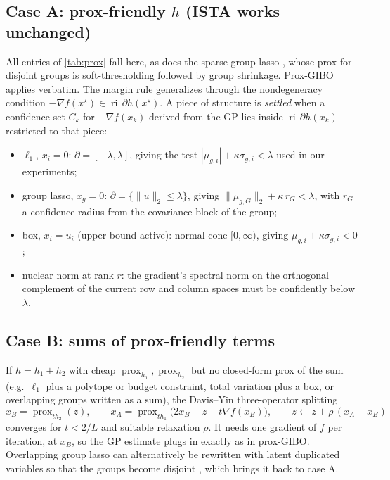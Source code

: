 \documentclass[10pt]{article}
\newcommand{\prox}{\operatorname{prox}}
\newcommand{\ri}{\operatorname{ri}}
\theoremstyle{remark}
\begin{document}
\subsection{Case A: prox-friendly $h$ (ISTA works unchanged)}
All entries of \cref{tab:prox} fall here, as does the sparse-group lasso \citep{simon2013sgl}, whose prox for disjoint groups is
soft-thresholding followed by group shrinkage. Prox-GIBO applies verbatim. The margin rule generalizes through the nondegeneracy condition
$-\nabla f(x^\star)\in\ri\,\partial h(x^\star)$. A piece of structure is \emph{settled} when a confidence set $C_k$ for $-\nabla f(x_k)$ derived from
the GP lies inside $\ri\,\partial h(x_k)$ restricted to that piece:
\begin{itemize}
\item $\ell_1$, $x_i=0$: $\partial=[-\lambda,\lambda]$, giving the test $|\mu_{g,i}|+\kappa\sigma_{g,i}<\lambda$ used in our experiments;
\item group lasso, $x_g=0$: $\partial=\{\|u\|_2\le\lambda\}$, giving $\|\mu_{g,G}\|_2+\kappa\,r_G<\lambda$, with $r_G$ a confidence radius from the
covariance block of the group;
\item box, $x_i=u_i$ (upper bound active): normal cone $[0,\infty)$, giving $\mu_{g,i}+\kappa\sigma_{g,i}<0$;
\item nuclear norm at rank $r$: the gradient's spectral norm on the orthogonal complement of the current row and column spaces must be
confidently below $\lambda$.
\end{itemize}

\subsection{Case B: sums of prox-friendly terms}
If $h=h_1+h_2$ with cheap $\prox_{h_1},\prox_{h_2}$ but no closed-form prox of the sum (e.g.\ $\ell_1$ plus a polytope or budget
constraint, total variation plus a box, or overlapping groups written as a sum), the Davis--Yin three-operator splitting \citep{davis2017three}
\[
x_B=\prox_{th_2}(z),\qquad x_A=\prox_{th_1}\big(2x_B-z-t\nabla f(x_B)\big),\qquad z\leftarrow z+\rho\,(x_A-x_B)
\]
converges for $t<2/L$ and suitable relaxation $\rho$. It needs one gradient of $f$ per iteration, at $x_B$, so the GP estimate plugs in exactly as in
prox-GIBO. Overlapping group lasso can alternatively be rewritten with latent duplicated variables so that the groups become disjoint
\citep{jacob2009overlap}, which brings it back to case A.
\end{document}
